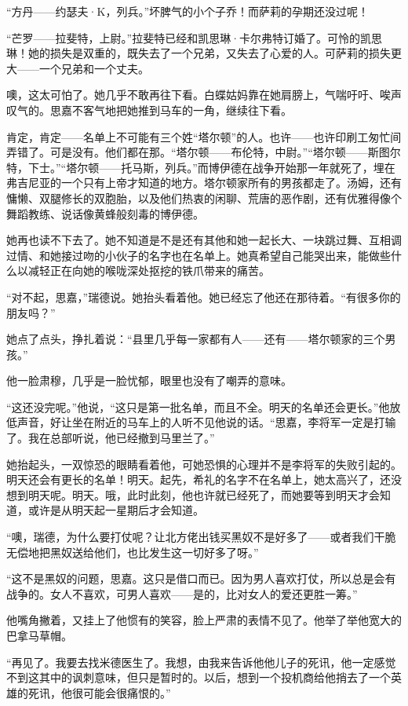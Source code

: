 \par “方丹——约瑟夫·K，列兵。”坏脾气的小个子乔！而萨莉的孕期还没过呢！
\par “芒罗——拉斐特，上尉。”拉斐特已经和凯思琳·卡尔弗特订婚了。可怜的凯思琳！她的损失是双重的，既失去了一个兄弟，又失去了心爱的人。可萨莉的损失更大——一个兄弟和一个丈夫。
\par 噢，这太可怕了。她几乎不敢再往下看。白蝶姑妈靠在她肩膀上，气喘吁吁、唉声叹气的。思嘉不客气地把她推到马车的一角，继续往下看。
\par 肯定，肯定——名单上不可能有三个姓“塔尔顿”的人。也许——也许印刷工匆忙间弄错了。可是没有。他们都在那。“塔尔顿——布伦特，中尉。”“塔尔顿——斯图尔特，下士。”“塔尔顿——托马斯，列兵。”而博伊德在战争开始那一年就死了，埋在弗吉尼亚的一个只有上帝才知道的地方。塔尔顿家所有的男孩都走了。汤姆，还有慵懒、双腿修长的双胞胎，以及他们热衷的闲聊、荒唐的恶作剧，还有优雅得像个舞蹈教练、说话像黄蜂般刻毒的博伊德。
\par 她再也读不下去了。她不知道是不是还有其他和她一起长大、一块跳过舞、互相调过情、和她接过吻的小伙子的名字也在名单上。她真希望自己能哭出来，能做些什么以减轻正在向她的喉咙深处抠挖的铁爪带来的痛苦。
\par “对不起，思嘉，”瑞德说。她抬头看着他。她已经忘了他还在那待着。“有很多你的朋友吗？”
\par 她点了点头，挣扎着说：“县里几乎每一家都有人——还有——塔尔顿家的三个男孩。”
\par 他一脸肃穆，几乎是一脸忧郁，眼里也没有了嘲弄的意味。
\par “这还没完呢。”他说，“这只是第一批名单，而且不全。明天的名单还会更长。”他放低声音，好让坐在附近的马车上的人听不见他说的话。“思嘉，李将军一定是打输了。我在总部听说，他已经撤到马里兰了。”
\par 她抬起头，一双惊恐的眼睛看着他，可她恐惧的心理并不是李将军的失败引起的。明天还会有更长的名单！明天。起先，希礼的名字不在名单上，她太高兴了，还没想到明天呢。明天。哦，此时此刻，他也许就已经死了，而她要等到明天才会知道，或许是从明天起一星期后才会知道。
\par “噢，瑞德，为什么要打仗呢？让北方佬出钱买黑奴不是好多了——或者我们干脆无偿地把黑奴送给他们，也比发生这一切好多了呀。”
\par “这不是黑奴的问题，思嘉。这只是借口而已。因为男人喜欢打仗，所以总是会有战争的。女人不喜欢，可男人喜欢——是的，比对女人的爱还更胜一筹。”
\par 他嘴角撇着，又挂上了他惯有的笑容，脸上严肃的表情不见了。他举了举他宽大的巴拿马草帽。
\par “再见了。我要去找米德医生了。我想，由我来告诉他他儿子的死讯，他一定感觉不到这其中的讽刺意味，但只是暂时的。以后，想到一个投机商给他捎去了一个英雄的死讯，他很可能会很痛恨的。”
